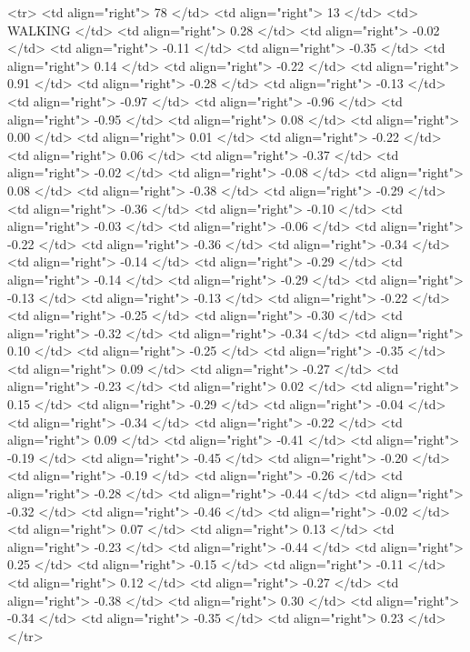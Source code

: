   <tr> <td align="right"> 78 </td> <td align="right">  13 </td> <td> WALKING </td> <td align="right"> 0.28 </td> <td align="right"> -0.02 </td> <td align="right"> -0.11 </td> <td align="right"> -0.35 </td> <td align="right"> 0.14 </td> <td align="right"> -0.22 </td> <td align="right"> 0.91 </td> <td align="right"> -0.28 </td> <td align="right"> -0.13 </td> <td align="right"> -0.97 </td> <td align="right"> -0.96 </td> <td align="right"> -0.95 </td> <td align="right"> 0.08 </td> <td align="right"> 0.00 </td> <td align="right"> 0.01 </td> <td align="right"> -0.22 </td> <td align="right"> 0.06 </td> <td align="right"> -0.37 </td> <td align="right"> -0.02 </td> <td align="right"> -0.08 </td> <td align="right"> 0.08 </td> <td align="right"> -0.38 </td> <td align="right"> -0.29 </td> <td align="right"> -0.36 </td> <td align="right"> -0.10 </td> <td align="right"> -0.03 </td> <td align="right"> -0.06 </td> <td align="right"> -0.22 </td> <td align="right"> -0.36 </td> <td align="right"> -0.34 </td> <td align="right"> -0.14 </td> <td align="right"> -0.29 </td> <td align="right"> -0.14 </td> <td align="right"> -0.29 </td> <td align="right"> -0.13 </td> <td align="right"> -0.13 </td> <td align="right"> -0.22 </td> <td align="right"> -0.25 </td> <td align="right"> -0.30 </td> <td align="right"> -0.32 </td> <td align="right"> -0.34 </td> <td align="right"> 0.10 </td> <td align="right"> -0.25 </td> <td align="right"> -0.35 </td> <td align="right"> 0.09 </td> <td align="right"> -0.27 </td> <td align="right"> -0.23 </td> <td align="right"> 0.02 </td> <td align="right"> 0.15 </td> <td align="right"> -0.29 </td> <td align="right"> -0.04 </td> <td align="right"> -0.34 </td> <td align="right"> -0.22 </td> <td align="right"> 0.09 </td> <td align="right"> -0.41 </td> <td align="right"> -0.19 </td> <td align="right"> -0.45 </td> <td align="right"> -0.20 </td> <td align="right"> -0.19 </td> <td align="right"> -0.26 </td> <td align="right"> -0.28 </td> <td align="right"> -0.44 </td> <td align="right"> -0.32 </td> <td align="right"> -0.46 </td> <td align="right"> -0.02 </td> <td align="right"> 0.07 </td> <td align="right"> 0.13 </td> <td align="right"> -0.23 </td> <td align="right"> -0.44 </td> <td align="right"> 0.25 </td> <td align="right"> -0.15 </td> <td align="right"> -0.11 </td> <td align="right"> 0.12 </td> <td align="right"> -0.27 </td> <td align="right"> -0.38 </td> <td align="right"> 0.30 </td> <td align="right"> -0.34 </td> <td align="right"> -0.35 </td> <td align="right"> 0.23 </td> </tr>
